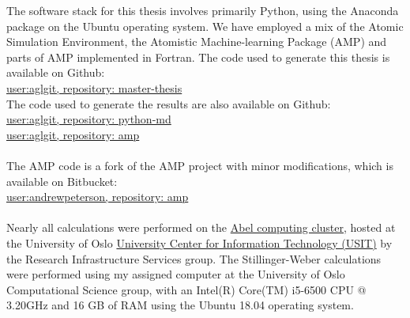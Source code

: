 The software stack for this thesis involves primarily Python,
using the Anaconda package on the Ubuntu operating system.
We have employed a mix of the Atomic Simulation Environment,
the Atomistic Machine-learning Package (AMP) and parts of AMP implemented
in Fortran.
The code used to generate this thesis is available
on Github: \\
\href{https://github.com/aglgit/master-thesis}{
    user:aglgit, repository: master-thesis} \\
The code used to generate the results are also available
on Github: \\
\href{https://github.com/aglgit/python-md}{
    user:aglgit, repository: python-md} \\
\href{https://github.com/aglgit/amp}{
    user:aglgit, repository: amp} \\
\\
The AMP code is a fork of the AMP project with minor modifications,
which is available on Bitbucket: \\
\href{https://bitbucket.org/andrewpeterson/amp/src/master/}{
    user:andrewpeterson, repository: amp} \\ \\
Nearly all calculations were performed on the 
\href{https://www.uio.no/english/services/it/research/hpc/abel/more/index.html}{Abel computing cluster},
hosted at the University of Oslo
\href{https://www.usit.uio.no/english/}{
University Center for Information Technology (USIT)} by the
Research Infrastructure Services group.
The Stillinger-Weber calculations were performed using my assigned computer
at the University of Oslo Computational Science group, with
an Intel(R) Core(TM) i5-6500 CPU @ 3.20GHz and 16 GB of RAM using
the Ubuntu 18.04 operating system.
